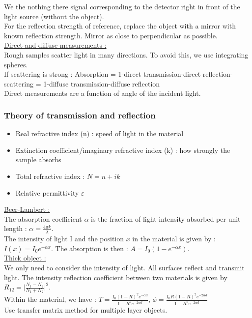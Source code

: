 \documentclass[../main.tex]{subfiles}
\begin{document}
We the nothing there signal corresponding to the detector right in front of the light source (without the object).\\
For the reflection strength of reference, replace the object with a mirror with known reflection strength. Mirror as close to perpendicular as possible.\\

\quad \underline{Direct and diffuse measurements :}\\
Rough samples scatter light in many directions. To avoid this, we use integrating spheres.\\

If scattering is strong : Absorption = 1-direct transmission-direct reflection-scattering = 1-diffuse transmission-diffuse reflection\\
Direct measurements are a function of angle of the incident light.\\

\subsubsection{Theory of transmission and reflection}
\begin{itemize}
    \item Real refractive index (n) : speed of light in the material\\
    \item Extinction coefficient/imaginary refractive index (k) : how strongly the sample absorbs\\
    \item Total refractive index : $N = n+ik$\\
    \item Relative permittivity $\varepsilon$\\
\end{itemize}

\quad \underline{Beer-Lambert :}\\
The absorption coefficient $\alpha$ is the fraction of light intensity absorbed per unit length : $\alpha = \frac{4\pi k}{\lambda}$.\\

The intensity of light I and the position $x$ in the material is given by : $I(x) = I_0 e^{-\alpha x}$. The absorption is then : $A = I_0 (1-e^{-\alpha x})$.\\

\quad \underline{Thick object :}\\
We only need to consider the intensity of light. All surfaces reflect and transmit light. The intensity reflection coefficient between two materials is given by $R_{12} = \lvert \frac{N_1-N_2}{N_1+N_2}\rvert^2$.\\
Within the material, we have : $T = \frac{I_0 (1-R)^2 e^{-\alpha d}}{1-R^2 e^{-2\alpha d}}$, $\phi = \frac{I_0 R (1-R)^2 e^{-2\alpha d}}{1-R^2 e^{-2\alpha d}}$\\
Use transfer matrix method for multiple layer objects.\\
\end{document}
